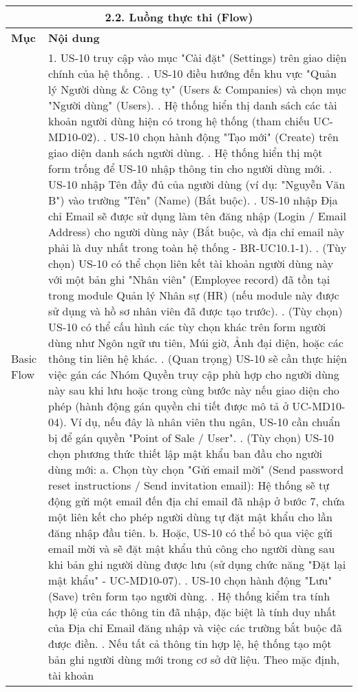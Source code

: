 \begin{longtable}{|m{4cm}|p{11cm}|}
\hline
\multicolumn{2}{|c|}{\textbf{2.2. Luồng thực thi (Flow)}} \\
\hline
\textbf{Mục} & \textbf{Nội dung} \\
\hline
Basic Flow & 1. US-10 truy cập vào mục "Cài đặt" (Settings) trên giao diện chính của hệ thống. \newline 2. US-10 điều hướng đến khu vực "Quản lý Người dùng \& Công ty" (Users \& Companies) và chọn mục "Người dùng" (Users). \newline 3. Hệ thống hiển thị danh sách các tài khoản người dùng hiện có trong hệ thống (tham chiếu UC-MD10-02). \newline 4. US-10 chọn hành động "Tạo mới" (Create) trên giao diện danh sách người dùng. \newline 5. Hệ thống hiển thị một form trống để US-10 nhập thông tin cho người dùng mới. \newline 6. US-10 nhập Tên đầy đủ của người dùng (ví dụ: "Nguyễn Văn B") vào trường "Tên" (Name) (Bắt buộc). \newline 7. US-10 nhập Địa chỉ Email sẽ được sử dụng làm tên đăng nhập (Login / Email Address) cho người dùng này (Bắt buộc, và địa chỉ email này phải là duy nhất trong toàn hệ thống - BR-UC10.1-1). \newline 8. (Tùy chọn) US-10 có thể chọn liên kết tài khoản người dùng này với một bản ghi "Nhân viên" (Employee record) đã tồn tại trong module Quản lý Nhân sự (HR) (nếu module này được sử dụng và hồ sơ nhân viên đã được tạo trước). \newline 9. (Tùy chọn) US-10 có thể cấu hình các tùy chọn khác trên form người dùng như Ngôn ngữ ưu tiên, Múi giờ, Ảnh đại diện, hoặc các thông tin liên hệ khác. \newline 10. (Quan trọng) US-10 sẽ cần thực hiện việc gán các Nhóm Quyền truy cập phù hợp cho người dùng này sau khi lưu hoặc trong cùng bước này nếu giao diện cho phép (hành động gán quyền chi tiết được mô tả ở UC-MD10-04). Ví dụ, nếu đây là nhân viên thu ngân, US-10 cần chuẩn bị để gán quyền "Point of Sale / User". \newline 11. (Tùy chọn) US-10 chọn phương thức thiết lập mật khẩu ban đầu cho người dùng mới: \newline     a. Chọn tùy chọn "Gửi email mời" (Send password reset instructions / Send invitation email): Hệ thống sẽ tự động gửi một email đến địa chỉ email đã nhập ở bước 7, chứa một liên kết cho phép người dùng tự đặt mật khẩu cho lần đăng nhập đầu tiên. \newline     b. Hoặc, US-10 có thể bỏ qua việc gửi email mời và sẽ đặt mật khẩu thủ công cho người dùng sau khi bản ghi người dùng được lưu (sử dụng chức năng "Đặt lại mật khẩu" - UC-MD10-07). \newline 12. US-10 chọn hành động "Lưu" (Save) trên form tạo người dùng. \newline 13. Hệ thống kiểm tra tính hợp lệ của các thông tin đã nhập, đặc biệt là tính duy nhất của Địa chỉ Email đăng nhập và việc các trường bắt buộc đã được điền. \newline 14. Nếu tất cả thông tin hợp lệ, hệ thống tạo một bản ghi người dùng mới trong cơ sở dữ liệu. Theo mặc định, tài khoản 
\end{longtable}
